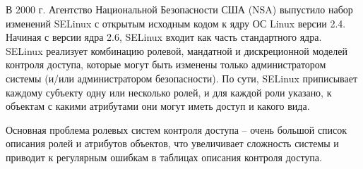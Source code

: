 В 2000 г. Агентство Национальной Безопасности США (NSA) выпустило набор изменений SELinux с открытым исходным кодом к ядру ОС Linux версии 2.4. Начиная с версии ядра 2.6, SELinux входит как часть стандартного ядра. SELinux реализует комбинацию ролевой, мандатной и дискреционной моделей контроля доступа, которые могут быть изменены только администратором системы (и/или администратором безопасности). По сути, SELinux приписывает каждому субъекту одну или несколько ролей, и для каждой роли указано, к объектам с какими атрибутами они могут иметь доступ и какого вида.

Основная проблема ролевых систем контроля доступа -- очень большой список описания ролей и атрибутов объектов, что увеличивает сложность системы и приводит к регулярным ошибкам в таблицах описания контроля доступа.
